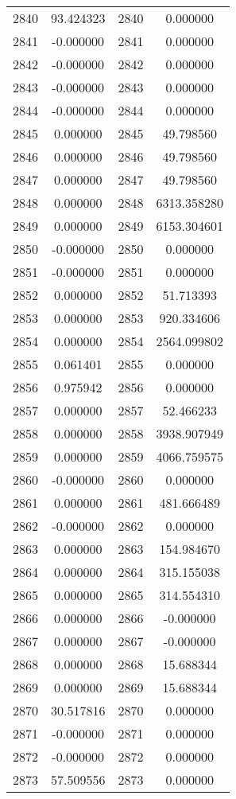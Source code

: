 \documentclass[12pt]{article}
\begin{document}
\begin{longtable}{@{}cccc@{}}
2840 & 93.424323 & 2840 & 0.000000 \\
2841 & -0.000000 & 2841 & 0.000000 \\
2842 & -0.000000 & 2842 & 0.000000 \\
2843 & -0.000000 & 2843 & 0.000000 \\
2844 & -0.000000 & 2844 & 0.000000 \\
2845 & 0.000000 & 2845 & 49.798560 \\
2846 & 0.000000 & 2846 & 49.798560 \\
2847 & 0.000000 & 2847 & 49.798560 \\
2848 & 0.000000 & 2848 & 6313.358280 \\
2849 & 0.000000 & 2849 & 6153.304601 \\
2850 & -0.000000 & 2850 & 0.000000 \\
2851 & -0.000000 & 2851 & 0.000000 \\
2852 & 0.000000 & 2852 & 51.713393 \\
2853 & 0.000000 & 2853 & 920.334606 \\
2854 & 0.000000 & 2854 & 2564.099802 \\
2855 & 0.061401 & 2855 & 0.000000 \\
2856 & 0.975942 & 2856 & 0.000000 \\
2857 & 0.000000 & 2857 & 52.466233 \\
2858 & 0.000000 & 2858 & 3938.907949 \\
2859 & 0.000000 & 2859 & 4066.759575 \\
2860 & -0.000000 & 2860 & 0.000000 \\
2861 & 0.000000 & 2861 & 481.666489 \\
2862 & -0.000000 & 2862 & 0.000000 \\
2863 & 0.000000 & 2863 & 154.984670 \\
2864 & 0.000000 & 2864 & 315.155038 \\
2865 & 0.000000 & 2865 & 314.554310 \\
2866 & 0.000000 & 2866 & -0.000000 \\
2867 & 0.000000 & 2867 & -0.000000 \\
2868 & 0.000000 & 2868 & 15.688344 \\
2869 & 0.000000 & 2869 & 15.688344 \\
2870 & 30.517816 & 2870 & 0.000000 \\
2871 & -0.000000 & 2871 & 0.000000 \\
2872 & -0.000000 & 2872 & 0.000000 \\
2873 & 57.509556 & 2873 & 0.000000 \\

\end{longtable}
\end{document}
